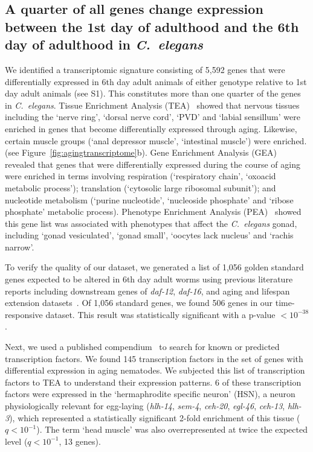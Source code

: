 \documentclass[9pt,twocolumn,twoside]{gsag3jnl}
\newcommand{\cel}{\emph{C.~elegans}}
\newcommand{\gene}[1]{\emph{\mbox{#1}}}
\newcommand{\agen}{5,592}
\newcommand{\tfaging}{145}
\newcommand{\goldn}{1,056}
\newcommand{\goldfound}{506}
\newcommand{\goldpval}{$<10^{-38}$}
\begin{document}
\subsection*{A quarter of all genes change expression between the 1st day of
             adulthood and the 6th day of adulthood in \cel{}}
We identified a transcriptomic signature consisting of \agen{} genes that were
differentially expressed in 6th day adult animals of either genotype relative to
1st day adult animals (see S1). This constitutes more than one quarter of
the genes in \cel{}. Tissue Enrichment Analysis
(TEA)~\citep{Angeles-Albores2016} showed that nervous tissues including the
`nerve ring', `dorsal nerve cord', `PVD' and `labial sensillum' were enriched in
genes that become differentially expressed through aging. Likewise, certain
muscle groups (`anal depressor muscle', `intestinal muscle') were enriched. (see
Figure~\ref{fig:agingtranscriptome}b). Gene Enrichment Analysis
(GEA)~\citep{Angeles-Albores106369} revealed that genes that were differentially
expressed during the course of aging were enriched in terms involving
respiration (`respiratory chain', `oxoacid metabolic process'); translation
(`cytosolic large ribosomal subunit'); and nucleotide metabolism (`purine
nucleotide', `nucleoside phosphate' and `ribose phosphate' metabolic process).
Phenotype Enrichment Analysis (PEA)~\citep{Angeles-Albores106369} showed this
gene list was associated with phenotypes that affect the \cel{} gonad, including
`gonad vesiculated', `gonad small', `oocytes lack nucleus' and `rachis narrow'.

To verify the quality of our dataset, we generated a list of \goldn{} golden
standard genes expected to be altered in 6th day adult worms using previous
literature reports including downstream genes of \gene{daf-12}, \gene{daf-16},
and aging and lifespan extension datasets~\citep{Murphy2003,
Halaschek-wiener2005,Lund2002,McCormick2012,Eckley2013}. Of \goldn{}
standard genes, we found \goldfound{} genes in our time-responsive dataset. This
result was statistically significant with a p-value \goldpval{}.

Next, we used a published compendium~\citep{Reece-Hoyes2005} to search for known
or predicted transcription factors. We found \tfaging{} transcription factors in
the set of genes with differential expression in aging nematodes. We subjected
this list of transcription factors to TEA to understand their expression
patterns. 6 of these transcription factors were expressed in the `hermaphrodite
specific neuron' (HSN), a neuron physiologically relevant for egg-laying
(\gene{hlh-14}, \gene{sem-4}, \gene{ceh-20}, \gene{egl-46}, \gene{ceh-13},
\gene{hlh-3}), which represented a statistically significant 2-fold enrichment
of this tissue ($q<10^{-1}$). The term `head muscle' was also overrepresented at
twice the expected level ($q<10^{-1}$, 13 genes).
\end{document}

